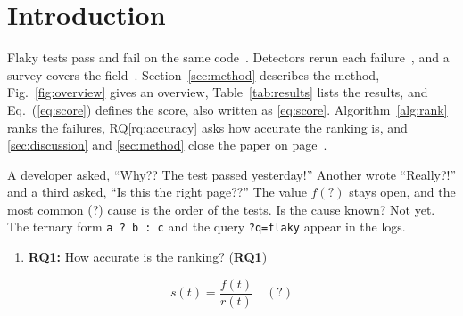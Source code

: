 \section{Introduction}\label{sec:intro}
Flaky tests pass and fail on the same code~\cite{luo2014}. Detectors rerun each failure~\cite{luo2014,bell2018},
and a survey covers the field~\cite{parry2021}. Section~\ref{sec:method} describes the method,
Fig.~\ref{fig:overview} gives an overview, Table~\ref{tab:results} lists the results, and
Eq.~(\ref{eq:score}) defines the score, also written as \eqref{eq:score}. Algorithm~\ref{alg:rank} ranks the
failures, RQ\ref{rq:accuracy} asks how accurate the ranking is, and \autoref{sec:discussion} and
\cref{sec:method} close the paper on page~\pageref{sec:discussion}.

A developer asked, ``Why?? The test passed yesterday!'' Another wrote ``Really?!'' and a third asked, ``Is this
the right page??'' The value $f(?)$ stays open, and the most common (?) cause is the order of the tests. Is the
cause known? Not yet. The ternary form \texttt{a ? b : c} and the query \texttt{?q=flaky} appear in the logs.

\begin{enumerate}
\item\label{rq:accuracy} \textbf{RQ1:} How accurate is the ranking? (\textbf{RQ1})
\end{enumerate}
\begin{equation}\label{eq:score}
s(t) = \frac{f(t)}{r(t)} \quad (?)
\end{equation}

